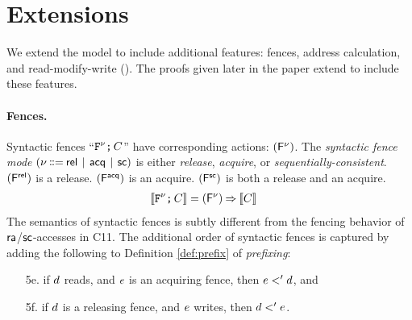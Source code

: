 \section{Extensions}
\label{sec:variants}

We extend the model to include additional
features: fences, address calculation, and read-modify-write (\RMW). The
proofs given later in the paper extend to include these features.  

\paragraph{Fences.}

Syntactic fences
``$\texttt{F}^{\nu} \texttt{;}\,\allowbreak C$'' have corresponding  actions: $(\smash{\mathsf{F}^{\nu}})$.  The \emph{syntactic fence mode}
$(\fmode \!\!\BNFDEF\!\! \modeREL \!\BNFSEP\! \modeACQ \!\BNFSEP\! \modeSC)$
is either \emph{release}, \emph{acquire}, or \emph{sequentially-consistent}.
$(\smash{\mathsf{F}^{{\mathsf{rel}}}})$ is a release. $(\smash{\mathsf{F}^{{\mathsf{acq}}}})$ is an acquire.
$(\smash{\mathsf{F}^{{\mathsf{sc}}}})$ is both a release and an acquire.
\begin{align*}
  \llbracket\texttt{F}^{\nu}\texttt{;}\,\allowbreak C\rrbracket & =
  (\smash{\mathsf{F}^{\nu}}) \mathbin\Rightarrow \llbracket C\rrbracket
\end{align*}
The semantics of syntactic fences
is subtly different from the fencing behavior of
${\mathsf{ra}}$/${\mathsf{sc}}$-accesses in C11. 
The additional order of syntactic fences is captured by adding the following
to Definition \ref{def:prefix} of \emph{prefixing}:
\begin{enumerate}
\item[5e.] if $d$ reads, and $e$ is an acquiring fence, then
  $e <' d$, and
\item[5f.] if $d$ is a releasing fence, and $e$ writes, then
  $d <' e$.
\end{enumerate}


